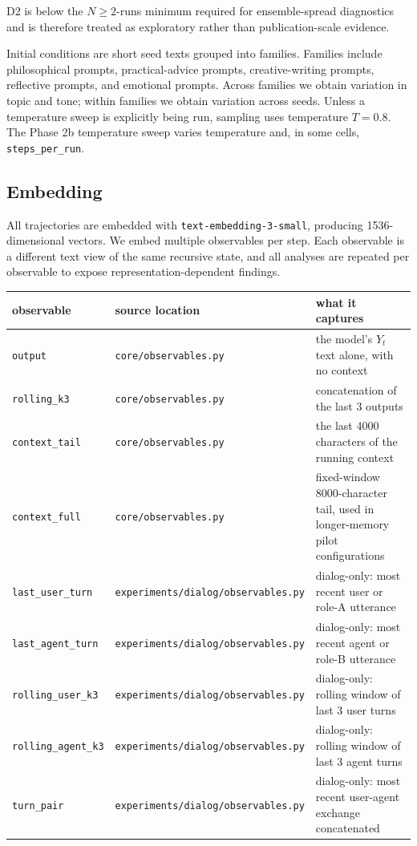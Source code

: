 \documentclass{article}
\theoremstyle{plain}
\theoremstyle{definition}
\begin{document}
D2 is below the \(N\geq 2\)-runs minimum required for ensemble-spread diagnostics and is therefore treated as exploratory rather than publication-scale evidence.

Initial conditions are short seed texts grouped into families. Families include philosophical prompts, practical-advice prompts, creative-writing prompts, reflective prompts, and emotional prompts. Across families we obtain variation in topic and tone; within families we obtain variation across seeds. Unless a temperature sweep is explicitly being run, sampling uses temperature \(T=0.8\). The Phase 2b temperature sweep varies temperature and, in some cells, \texttt{steps\_per\_run}.

\subsection{Embedding}

All trajectories are embedded with \texttt{text-embedding-3-small}, producing 1536-dimensional vectors. We embed multiple observables per step. Each observable is a different text view of the same recursive state, and all analyses are repeated per observable to expose representation-dependent findings.

\begin{table}[h!]
\centering
\small
\begin{tabularx}{\textwidth}{lYY}
\toprule
observable & source location & what it captures \\
\midrule
\texttt{output} & \texttt{core/observables.py} & the model's \(Y_t\) text alone, with no context \\
\texttt{rolling\_k3} & \texttt{core/observables.py} & concatenation of the last 3 outputs \\
\texttt{context\_tail} & \texttt{core/observables.py} & the last 4000 characters of the running context \\
\texttt{context\_full} & \texttt{core/observables.py} & fixed-window 8000-character tail, used in longer-memory pilot configurations \\
\texttt{last\_user\_turn} & \texttt{experiments/dialog/observables.py} & dialog-only: most recent user or role-A utterance \\
\texttt{last\_agent\_turn} & \texttt{experiments/dialog/observables.py} & dialog-only: most recent agent or role-B utterance \\
\texttt{rolling\_user\_k3} & \texttt{experiments/dialog/observables.py} & dialog-only: rolling window of last 3 user turns \\
\texttt{rolling\_agent\_k3} & \texttt{experiments/dialog/observables.py} & dialog-only: rolling window of last 3 agent turns \\
\texttt{turn\_pair} & \texttt{experiments/dialog/observables.py} & dialog-only: most recent user-agent exchange concatenated \\
\bottomrule
\end{tabularx}
\end{table}
\end{document}
